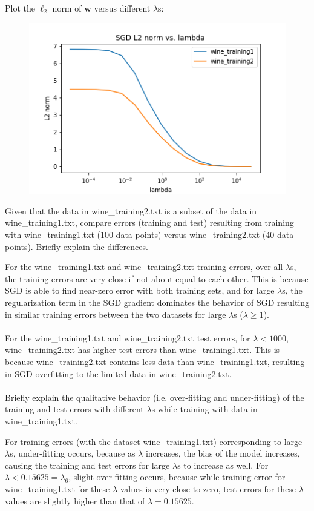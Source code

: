 \noindent
Plot the $\ell_2$ norm of $\mathbf{w}$ versus different $\lambda$s:
\noindent
\begin{figure}[H]
\centering
\includegraphics[scale=0.6]{2c_plot_l2_norms.png}
\end{figure}
\noindent

\problem[4]
Given that the data in wine\_training2.txt is a subset of the data in wine\_training1.txt, compare errors (training and test) resulting from training with wine\_training1.txt (100 data points) versus wine\_training2.txt (40 data points). Briefly explain the differences.

For the wine\_training1.txt and wine\_training2.txt training errors, over all $\lambda$s, the training errors are very close if not about equal to each other. This is because SGD is able to find near-zero error with both training sets, and for large $\lambda$s, the regularization term in the SGD gradient dominates the behavior of SGD resulting in similar training errors between the two datasets for large $\lambda$s ($\lambda \geq 1$).\\
\\
For the wine\_training1.txt and wine\_training2.txt test errors, for $\lambda < 1000$, wine\_training2.txt has higher test errors than wine\_training1.txt. This is because wine\_training2.txt contains less data than wine\_training1.txt, resulting in SGD overfitting to the limited data in wine\_training2.txt.\\
\\

\problem[4]
Briefly explain the qualitative behavior (i.e. over-fitting and under-fitting) of the training and test errors with different $\lambda$s while training with data in wine\_training1.txt.

For training errors (with the dataset wine\_training1.txt) corresponding to large $\lambda$s, under-fitting occurs, because as $\lambda$ increases, the bias of the model increases, causing the training and test errors for large $\lambda$s to increase as well. For $\lambda < 0.15625 = \lambda_6$, slight over-fitting occurs, because while training error for wine\_training1.txt for these $\lambda$ values is very close to zero, test errors for these $\lambda$ values are slightly higher than that of $\lambda = 0.15625$.


